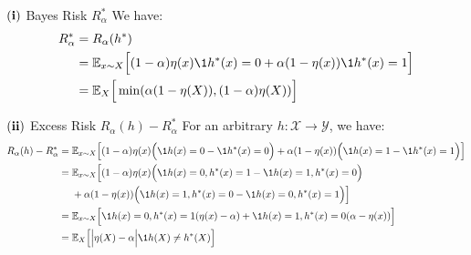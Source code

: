 \begin{solution*}
    \begin{subproof}{\newline $\bf(i)$ Bayes Risk $R_\alpha^*$}
        We have:
        \begin{align*}
            R_\alpha^* &= R_\alpha(h^*) \\
                &= \mathbb{E}_{x\sim X}\Big[
                    (1-\alpha)\eta(x)\1{h^*(x)=0} + \alpha(1-\eta(x))\1{h^*(x)=1}
                \Big] \\
                &= \mathbb{E}_X\Big[ \min(\alpha(1-\eta(X)), (1-\alpha)\eta(X)) \Big]
        \end{align*}
    \end{subproof}

    \begin{subproof}{\newline $\bf (ii)$ Excess Risk $R_\alpha(h)-R_\alpha^*$}
        For an arbitrary $h:\mathcal{X} \to\mathcal{Y}$, we have:
        \begin{align*}
            R_\alpha(h) - R_\alpha^* 
                &=  \mathbb{E}_{x\sim X}\bigSquare{
                    (1-\alpha)\eta(x)\bigRound{\1{h(x)=0} - \1{h^*(x)=0}} +\alpha(1-\eta(x))\bigRound{\1{h(x)=1} - \1{h^*(x)=1}}
                } \\
                &= \mathbb{E}_{x\sim X}\bigSquare{
                    (1-\alpha)\eta(x)\bigRound{\1{h(x)=0, h^*(x)=1} - \1{h(x)=1, h^*(x)=0}} \\
                & \ \ \ \ +\alpha(1-\eta(x))\bigRound{\1{h(x)=1, h^*(x)=0} - \1{h(x)=0, h^*(x)=1}}
                } \\
                &= \mathbb{E}_{x\sim X}\bigSquare{
                    \1{h(x)=0, h^*(x)=1}(\eta(x)-\alpha) + \1{h(x)=1, h^*(x)=0}(\alpha-\eta(x))
                } \\
                &= \mathbb{E}_{X}\bigSquare{
                    \bigAbs{\eta(X) - \alpha}\1{h(X)\ne h^*(X)}
                }
        \end{align*}
    \end{subproof}
\end{solution*}

